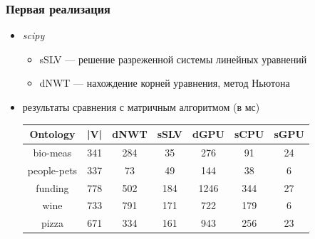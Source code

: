 \documentclass[xcolor=table]{beamer}
\begin{document}
\begin{frame}[fragile]
  \transwipe[direction=90]
  \frametitle{Первая реализация}

\begin{itemize}
    \item \textit{scipy}
    \begin{itemize}
        \item sSLV --- решение разреженной системы линейных уравнений
        \item dNWT --- нахождение корней уравнения, метод Ньютона
    \end{itemize}
    \item результаты сравнения с матричным алгоритмом (в мс)

        \begin{table}[h]
        \centering
        \begin{tabular}{ | c | c || c | c || c | c | c |}
        \hline
        Ontology    & |V| & dNWT & sSLV & dGPU & sCPU &  sGPU \\
        \hline
        \hline
        bio-meas    & 341 &  284 & 35   & 276  & 91  & 24\\
        people-pets & 337 &  73  & 49   & 144  & 38  & 6\\
        funding     & 778 &  502 & 184  & 1246 & 344 & 27\\
        wine        & 733 &  791 & 171  & 722  & 179 & 6\\
        pizza       & 671 &  334 & 161  & 943  & 256 & 23\\
        \hline
        \end{tabular}
        
        \end{table}

\end{itemize}
\end{frame}
\end{document}
